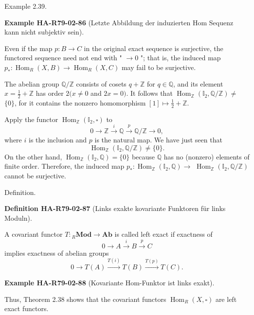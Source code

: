 \documentclass[10pt, letterpaper]{article}
\newcommand{\CustomHeading}[3]{%
  \par\medskip\noindent%
  \textbf{#1 #2} \textnormal{(#3)}.\enskip%
}
\newenvironment{DEF}[2]{\begin{unitbox}\CustomHeading{Definition}{#1}{#2}}{\end{unitbox}}
\newenvironment{EXA}[2]{\begin{unitbox}\CustomHeading{Example}{#1}{#2}}{\end{unitbox}}
\begin{document}
Example 2.39. 

\begin{EXA}{HA-R79-02-86}{Letzte Abbildung der induzierten Hom Sequenz kann nicht subjektiv sein}
Even if the map $p: B \rightarrow C$ in the original exact sequence is surjective, the functored sequence need not end with " $\rightarrow 0$ "; that is, the induced map $p_{*}: \operatorname{Hom}_{R}(X, B) \rightarrow \operatorname{Hom}_{R}(X, C)$ may fail to be surjective.

The abelian group $\mathbb{Q} / \mathbb{Z}$ consists of cosets $q+\mathbb{Z}$ for $q \in \mathbb{Q}$, and its element $x=\frac{1}{2}+\mathbb{Z}$ has order $2(x \neq 0$ and $2 x=0)$. It follows that $\operatorname{Hom}_{\mathbb{Z}}\left(\mathbb{I}_{2}, \mathbb{Q} / \mathbb{Z}\right) \neq$ $\{0\}$, for it contains the nonzero homomorphism $[1] \mapsto \frac{1}{2}+\mathbb{Z}$.

Apply the functor $\operatorname{Hom}_{\mathbb{Z}}\left(\mathbb{I}_{2}, \square\right)$ to
$$
0 \rightarrow \mathbb{Z} \xrightarrow{i} \mathbb{Q} \xrightarrow{p} \mathbb{Q} / \mathbb{Z} \rightarrow 0,
$$
where $i$ is the inclusion and $p$ is the natural map. We have just seen that
$$
\operatorname{Hom}_{\mathbb{Z}}\left(\mathbb{I}_{2}, \mathbb{Q} / \mathbb{Z}\right) \neq\{0\} .
$$
On the other hand, $\operatorname{Hom}_{\mathbb{Z}}\left(\mathbb{I}_{2}, \mathbb{Q}\right)=\{0\}$ because $\mathbb{Q}$ has no (nonzero) elements of finite order. Therefore, the induced map $p_{*}: \operatorname{Hom}_{\mathbb{Z}}\left(\mathbb{I}_{2}, \mathbb{Q}\right) \rightarrow$ $\operatorname{Hom}_{\mathbb{Z}}\left(\mathbb{I}_{2}, \mathbb{Q} / \mathbb{Z}\right)$ cannot be surjective.
\end{EXA}



Definition. 


\begin{DEF}{HA-R79-02-87}{Links exakte kovariante Funktoren für links Moduln}
A covariant functor $T:{ }_{R} \mathbf{M o d} \rightarrow \mathbf{A b}$ is called left exact if exactness of
$$
0 \rightarrow A \xrightarrow{i} B \xrightarrow{p} C
$$
implies exactness of abelian groups
$$
0 \rightarrow T(A) \xrightarrow{T(i)} T(B) \xrightarrow{T(p)} T(C) .
$$
\end{DEF}


\begin{EXA}{HA-R79-02-88}{Kovariante Hom-Funktor ist links exakt}
Thus, Theorem 2.38 shows that the covariant functors $\operatorname{Hom}_{R}(X, \square)$ are left exact functors.
\end{EXA}
\end{document}
